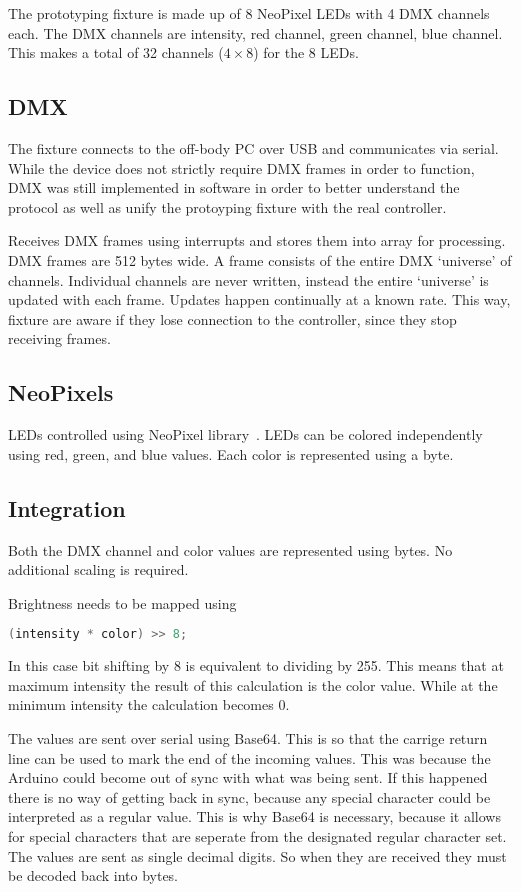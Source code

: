 The prototyping fixture is made up of 8 NeoPixel LEDs with 4 DMX channels each.
The DMX channels are intensity, red channel, green channel, blue channel.
This makes a total of 32 channels (\(4 \times 8\)) for the 8 LEDs.

\subsection{DMX}
The fixture connects to the off-body PC over USB and communicates via serial.
While the device does not strictly require DMX frames in order to function,
DMX was still implemented in software in order to better understand the protocol as well as unify the protoyping fixture with the real controller.


Receives DMX frames using interrupts
and stores them into array for processing.
DMX frames are 512 bytes wide.
A frame consists of the entire DMX `universe' of channels.
Individual channels are never written,
instead the entire `universe' is updated with each frame.
Updates happen continually at a known rate.
This way, fixture are aware if they lose connection to the controller,
since they stop receiving frames.

\subsection{NeoPixels}
LEDs controlled using NeoPixel library~\cite{NeoPixel}.
LEDs can be colored independently using red, green, and blue values.
Each color is represented using a byte.

\subsection{Integration}
Both the DMX channel and color values are represented using bytes.
No additional scaling is required.

Brightness needs to be mapped using
\begin{lstlisting}[language=C]
  (intensity * color) >> 8;
\end{lstlisting}

In this case bit shifting by 8 is equivalent to dividing by 255.
This means that at maximum intensity the result of this calculation is the color value.
While at the minimum intensity the calculation becomes 0.

The values are sent over serial using Base64.
This is so that the carrige return line can be used to mark the end of the incoming values.
This was because the Arduino could become out of sync with what was being sent.
If this happened there is no way of getting back in sync,
because any special character could be interpreted as a regular value.
This is why Base64 is necessary, because it allows for special characters that are seperate
from the designated regular character set.
The values are sent as single decimal digits.
So when they are received they must be decoded back into bytes.

